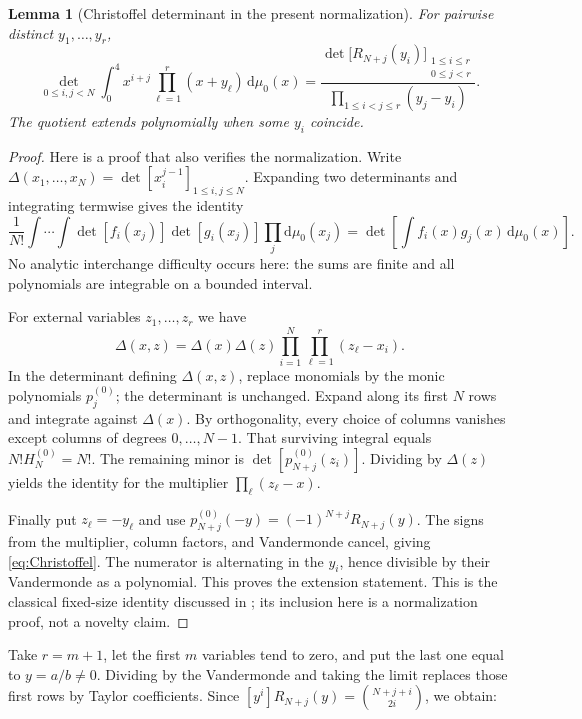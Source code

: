 \documentclass[11pt,a4paper]{article}
\numberwithin{equation}{section}
\newtheorem{lemma}[theorem]{Lemma}
\theoremstyle{definition}
\theoremstyle{remark}
\newcommand{\dd}{\mathrm d}
\begin{document}
\begin{lemma}[Christoffel determinant in the present normalization]
\label{lem:Christoffel}
For pairwise distinct $y_1,\ldots,y_r$,
\begin{equation}\label{eq:Christoffel}
 \det_{0\leq i,j<N}\int_0^4 x^{i+j}
        \prod_{\ell=1}^r(x+y_\ell)\,\dd\mu_0(x)
 =\frac{\det\bigl[R_{N+j}(y_i)\bigr]_{\substack{1\leq i\leq r\\0\leq j<r}}}
        {\prod_{1\leq i<j\leq r}(y_j-y_i)}.
\end{equation}
The quotient extends polynomially when some $y_i$ coincide.
\end{lemma}
\begin{proof}
Here is a proof that also verifies the normalization.  Write
$\Delta(x_1,\ldots,x_N)=\det[x_i^{j-1}]_{1\leq i,j\leq N}$.
Expanding two determinants and integrating termwise gives the identity
\[
 \frac1{N!}\int\cdots\int
 \det[f_i(x_j)]\det[g_i(x_j)]\prod_j\dd\mu_0(x_j)
 =\det\left[\int f_i(x)g_j(x)\,\dd\mu_0(x)\right].
\]
No analytic interchange difficulty occurs here: the sums are finite and
all polynomials are integrable on a bounded interval.

For external variables $z_1,\ldots,z_r$ we have
\[
 \Delta(x,z)=\Delta(x)\Delta(z)
            \prod_{i=1}^N\prod_{\ell=1}^r(z_\ell-x_i).
\]
In the determinant defining $\Delta(x,z)$, replace monomials by the
monic polynomials $p_j^{(0)}$; the determinant is unchanged.  Expand
along its first $N$ rows and integrate against $\Delta(x)$.  By
orthogonality, every choice of columns vanishes except columns of
degrees $0,\ldots,N-1$.  That surviving integral equals
$N!H_N^{(0)}=N!$.  The remaining minor is
$\det[p_{N+j}^{(0)}(z_i)]$.  Dividing by $\Delta(z)$ yields the identity
for the multiplier $\prod_\ell(z_\ell-x)$.

Finally put $z_\ell=-y_\ell$ and use
$p_{N+j}^{(0)}(-y)=(-1)^{N+j}R_{N+j}(y)$.  The signs from the multiplier,
column factors, and Vandermonde cancel, giving \eqref{eq:Christoffel}.
The numerator is alternating in the $y_i$, hence divisible by their
Vandermonde as a polynomial.  This proves the extension statement.
This is the classical fixed-size identity discussed in
\cite{Krattenthaler2023}; its inclusion here is a normalization proof,
not a novelty claim.
\end{proof}

Take $r=m+1$, let the first $m$ variables tend to zero, and put the last
one equal to $y=a/b\ne0$.  Dividing by the Vandermonde and taking the
limit replaces those first rows by Taylor coefficients.  Since
$[y^i]R_{N+j}(y)=\binom{N+j+i}{2i}$, we obtain:
\end{document}
